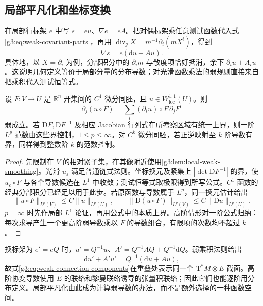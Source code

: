 \subsection{局部平凡化和坐标变换}
\label{g3:subsec:1101:04}
在局部行标架 \(e\) 中写 \(s=eu\)、\(\nabla e=eA\)。把对偶标架乘任意测试函数代入式\eqref{g3:eq:weak-covariant-parts}，再用 \(\operatorname{div}_gX=m^{-1}\partial_i(mX^i)\)，得到
\begin{equation}\label{g3:eq:weak-connection-components}
	\nabla s=e(\mathrm du+Au).
\end{equation}
具体地，以 \(X=\partial_i\) 为例，分部积分中的 \(\partial_i m\) 与散度项恰好抵消，余下 \(\partial_i u+A_i u\)。这说明几何定义等价于局部分量的分布导数；对光滑函数乘法的弱规则直接来自把乘积代入测试恒等式。

\begin{proposition}\label{g3:prop:weak-coordinate-change}
	设 \(F:V\to U\) 是 \(\mathbb R^n\) 开集间的 \(C^1\) 微分同胚，且 \(u\in W^{1,1}_{\mathrm{loc}}(U)\)。则
	\[
		\partial_j(u\circ F)=\sum_i(\partial_i u)\circ F\,\partial_jF^i
	\]
	弱成立。若 \(\mathrm DF,\mathrm DF^{-1}\) 及相应 Jacobian 行列式在所考察区域有统一上界，则一阶 \(L^p\) 范数由这些界控制，\(1\le p\le\infty\)。对 \(C^k\) 微分同胚，若正逆映射至 \(k\) 阶导数有界，同样得到整数阶 \(k\) 的范数控制。
\end{proposition}
\begin{proof}
	先限制在 \(V\) 的相对紧子集，在其像附近使用\cref{g3:lem:local-weak-smoothing}。光滑 \(u_\varepsilon\) 满足普通链式法则。坐标换元及紧集上 \(|\det\mathrm DF^{-1}|\) 的界，使 \(u_\varepsilon\circ F\) 与各个导数候选在 \(L^1\) 中收敛；测试恒等式取极限得到所写公式。\(C^1\) 函数的经典分部积分已经足以用于此步。若原函数与导数属于 \(L^p\)，同一换元估计给出
	\[
		\|u\circ F\|_{L^p(V)}\le C\|u\|_{L^p(U)},\qquad
		\|\mathrm D(u\circ F)\|_{L^p(V)}\le C\|\mathrm Du\|_{L^p(U)}.
	\]
	\(p=\infty\) 时先作局部 \(L^1\) 论证，再用公式中的本质上界。高阶情形对一阶公式归纳：每次求导产生一个更高阶弱导数乘以 \(F\) 的导数组合，有限项的次数均不超过 \(k\)。
\end{proof}

换标架为 \(e'=eQ\) 时，\(u'=Q^{-1}u\)、\(A'=Q^{-1}AQ+Q^{-1}\mathrm dQ\)。弱乘积法则给出
\[
	\mathrm du'+A'u'=Q^{-1}(\mathrm du+Au),
\]
故式\eqref{g3:eq:weak-connection-components}在重叠处表示同一个 \(\mathrm T^*M\otimes E\) 截面。高阶协变导数使用 \(E\) 的联络和黎曼联络诱导的张量积联络；因此它们也能逐阶用分布定义。局部平凡化由此成为计算弱导数的办法，而不是额外选择的一种函数空间。
